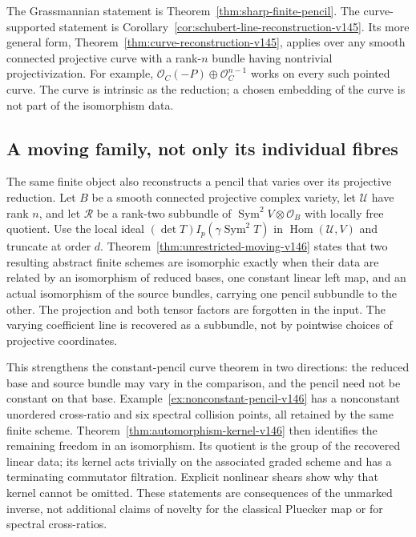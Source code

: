 \documentclass[11pt,reqno]{amsart}
\numberwithin{equation}{section}
\theoremstyle{definition}\newtheorem{definition}[theorem]{Definition}
\theoremstyle{remark}\newtheorem{remark}[theorem]{Remark}
\newcommand{\OO}{\mathcal O}\newcommand{\II}{\mathcal I}
\DeclareMathOperator{\Sym}{Sym}\DeclareMathOperator{\Gr}{Gr}
\DeclareMathOperator{\Hom}{Hom}\DeclareMathOperator{\Tot}{Tot}
\begin{document}
The Grassmannian statement is Theorem~\ref{thm:sharp-finite-pencil}.
The curve-supported statement is
Corollary~\ref{cor:schubert-line-reconstruction-v145}.  Its more general
form, Theorem~\ref{thm:curve-reconstruction-v145}, applies over any
smooth connected projective curve with a rank-\(n\) bundle having
nontrivial projectivization.  For example,
\(\OO_C(-P)\oplus\OO_C^{n-1}\) works on every such pointed curve.
The curve is intrinsic as the reduction; a chosen embedding of the
curve is not part of the isomorphism data.

\subsection{A moving family, not only its individual fibres}
The same finite object also reconstructs a pencil that varies over its
projective reduction.  Let \(B\) be a smooth connected projective
complex variety, let \(\mathcal U\) have rank \(n\), and let \(\mathcal R\) be a rank-two subbundle of
\(\Sym^2V\otimes\OO_B\) with locally free quotient.  Use the local
ideal \((\det T)I_p(\gamma\Sym^2T)\) in
\(\Hom(\mathcal U,V)\) and truncate at order \(d\).
Theorem~\ref{thm:unrestricted-moving-v146} states that two resulting
abstract finite schemes are isomorphic exactly when their data are
related by an isomorphism of reduced bases, one constant linear left
map, and an actual isomorphism of the source bundles, carrying one
pencil subbundle to the other.  The projection and both tensor factors
are forgotten in the input.  The varying coefficient line is recovered
as a subbundle, not by pointwise choices of projective coordinates.

This strengthens the constant-pencil curve theorem in two directions:
the reduced base and source bundle may vary in the comparison, and the
pencil need not be constant on that base.  Example~\ref{ex:nonconstant-pencil-v146}
has a nonconstant unordered cross-ratio and six spectral collision
points, all retained by the same finite scheme.  Theorem~\ref{thm:automorphism-kernel-v146}
then identifies the remaining freedom in an isomorphism.  Its quotient
is the group of the recovered linear data; its kernel acts trivially
on the associated graded scheme and has a terminating commutator
filtration.  Explicit nonlinear shears show why that kernel cannot be
omitted.  These statements are consequences of the unmarked inverse,
not additional claims of novelty for the classical Pluecker map or
for spectral cross-ratios.
\end{document}
